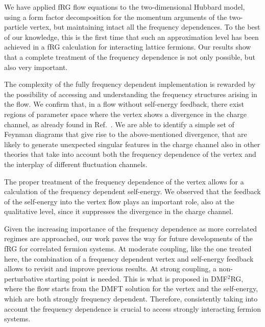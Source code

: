 We have applied fRG flow equations to the two-dimensional Hubbard model, using a form factor decomposition for the momentum arguments of the two-particle vertex, but maintaining intact all the frequency dependences. 
To the best of our knowledge, this is the first time that such an approximation level has been achieved in a fRG calculation for interacting lattice fermions.
Our results show that a complete treatment of the frequency dependence is not only possible, but also very important.

The complexity of the fully frequency dependent implementation is rewarded by the possibility of accessing and understanding the frequency structures arising in the flow.
We confirm that, in a flow without self-energy feedback, there exist regions of parameter space where the vertex shows a divergence in the charge channel, as already found in Ref.~.
We are able to identify a simple set of Feynman diagrams that give rise to the above-mentioned divergence, that are likely to generate unexpected singular features in the charge channel also in other theories that take into account both the frequency dependence of the vertex and the interplay of different fluctuation channels.\cite{Stepanov2016}
 
The proper treatment of the frequency dependence of the vertex allows for a calculation of the frequency dependent self-energy.
We observed that the feedback of the self-energy into the vertex flow plays an important role, also at the qualitative level, since it suppresses the divergence in the charge channel. 

Given the increasing importance of the frequency dependence as more correlated regimes are approached, our work paves the way for future developments of the fRG for correlated fermion systems.
At moderate coupling, like the one treated here, the combination of a frequency dependent vertex and self-energy feedback allows to revisit and improve previous results. At strong coupling, a non-perturbative starting point is needed. 
This is what is proposed in DMF$^2$RG,\cite{Taranto2014} where the flow starts from the DMFT solution for the vertex and the self-energy, which are both strongly frequency dependent. Therefore, consistently taking into account the frequency dependence is crucial to access strongly interacting fermion systems.

